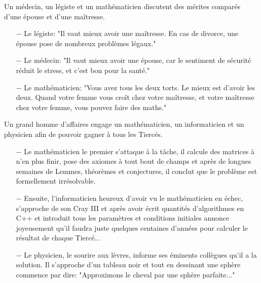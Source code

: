 Un médecin, un légiste et un mathématicien discutent des mérites comparés d'une épouse et d'une maîtresse.

\begin{itemize}	 
	\item[$-$] Le légiste: "Il vaut mieux avoir une maîtresse. En cas de divorce, une épouse pose de nombreux problèmes légaux."

	\item[$-$] Le médecin: "Il vaut mieux avoir une épouse, car le sentiment de sécurité réduit le stress, et c'est bon pour la santé."

	\item[$-$] Le mathématicien: "Vous avez tous les deux torts. Le mieux est d'avoir les deux. Quand votre femme vous croît chez votre maîtresse, et votre maîtresse chez votre femme, vous pouvez faire des maths."
\end{itemize}	

\begin{center}\underline{\hspace{5 cm}}\end{center}

Un grand homme d'affaires engage un mathématicien, un informaticien et un physicien afin de pouvoir gagner à tous les Tiercés.

\begin{itemize}	 
	\item[$-$] Le mathématicien le premier s'attaque à la tâche, il calcule des matrices à n'en plus finir, pose des axiomes à tout bout de champs et après de longues semaines de Lemmes, théorèmes et conjectures, il conclut que le problème est formellement irrésolvable.

	\item[$-$] Ensuite, l'informaticien heureux d'avoir vu le mathématicien en échec, s'approche de son Cray III et après avoir écrit quantités d'algorithmes en C++ et introduit tous les paramètres et conditions initiales annonce joyeusement qu'il faudra juste quelques centaines d'années pour calculer le résultat de chaque Tiercé...

	\item[$-$] Le physicien, le sourire aux lèvres, informe ses éminents collègues qu'il a la solution. Il s'approche d'un tableau noir et tout en dessinant une sphère commence par dire: "Approximons le cheval par une sphère parfaite..."
\end{itemize}

\begin{center}\underline{\hspace{5 cm}}\end{center}

